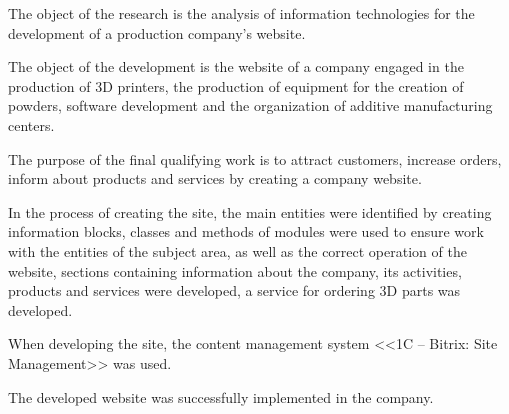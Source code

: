 The object of the research is the analysis of information technologies for the development of a production company's website.

The object of the development is the website of a company engaged in the production of 3D printers, the production of equipment for the creation of powders, software development and the organization of additive manufacturing centers.

The purpose of the final qualifying work is to attract customers, increase orders, inform about products and services by creating a company website.

In the process of creating the site, the main entities were identified by creating information blocks, classes and methods of modules were used to ensure work with the entities of the subject area, as well as the correct operation of the website, sections containing information about the company, its activities, products and services were developed, a service for ordering 3D parts was developed.

When developing the site, the content management system <<1C – Bitrix: Site Management>> was used.

The developed website was successfully implemented in the company.
